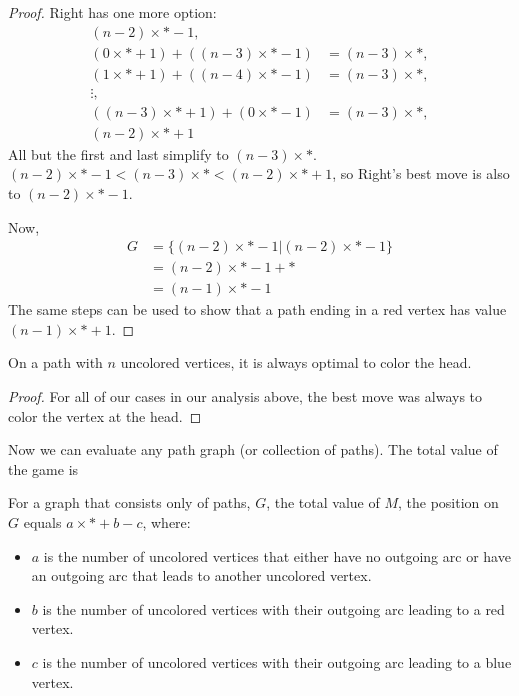 \documentclass[letter,10pt]{article}
\begin{document}
\begin{proof}
  Right has one more option: 
    \begin{align*}
      (n-2) \times * - 1,\\
      (0 \times * + 1) + ((n-3) \times * - 1) & = (n-3) \times *, \\
      (1 \times * + 1) + ((n-4) \times * - 1) & = (n-3) \times *, \\
      \vdots, \\
      ((n-3) \times * + 1) + (0 \times * - 1) & = (n-3) \times *, \\
      (n-2) \times * + 1
    \end{align*}
    All but the first and last simplify to $(n-3) \times *$.  $(n-2) \times * - 1 < (n-3) \times * < (n-2) \times * + 1$, so Right's best move is also to $(n-2) \times * - 1$.
  
  Now, 
  \begin{align*}
    G &= \{(n-2) \times * - 1 | (n-2) \times * - 1\} \\
    & = (n-2) \times * - 1 + *\\
    & = (n-1) \times * - 1
  \end{align*}
  The same steps can be used to show that a path ending in a red vertex has value $(n-1) \times * + 1$.
\end{proof}

\begin{corollary}
  On a path with $n$ uncolored vertices, it is always optimal to color the head.
\end{corollary}
\begin{proof}
  For all of our cases in our analysis above, the best move was always to color the vertex at the head.
\end{proof}

Now we can evaluate any path graph (or collection of paths).  The total value of the game is 

\begin{corollary}
\label{corol:pathMyopicCol}
    For a graph that consists only of paths, $G$, the total value of $M$, the  position on $G$ equals $a \times * + b - c$, where:
    \begin{itemize}
        \item $a$ is the number of uncolored vertices that either have no outgoing arc or have an outgoing arc that leads to another uncolored vertex.
        \item $b$ is the number of uncolored vertices with their outgoing arc leading to a red vertex.
        \item $c$ is the number of uncolored vertices with their outgoing arc leading to a blue vertex.
    \end{itemize}
\end{corollary}
\end{document}
